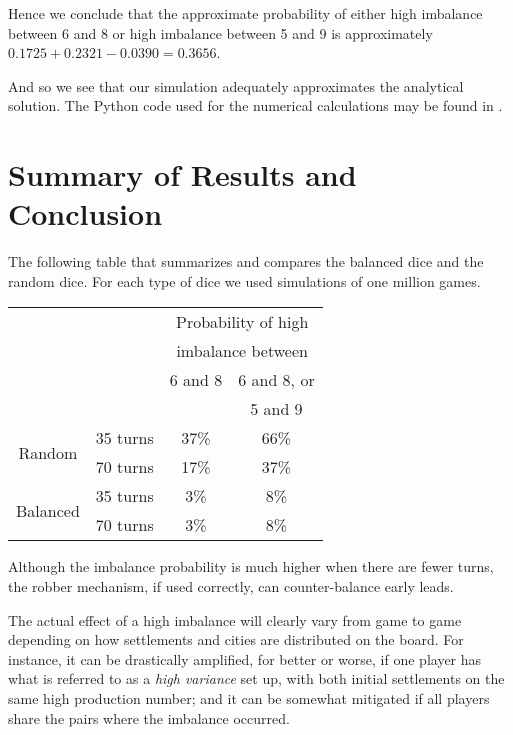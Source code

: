 \documentclass[11pt]{article}
\begin{document}
Hence we conclude that the approximate probability of either high imbalance between 6 and 8 or high imbalance between 5 and 9 is approximately $0.1725 + 0.2321 - 0.0390 = 0.3656$.

And so we see that our simulation adequately approximates the analytical solution. The Python code used for the numerical calculations may be found in \cite{githubsim}.

\section{Summary of Results and Conclusion}
The following table that summarizes and compares the balanced dice and the random dice. For each type of dice we used simulations of one million games.

\begin{center}
\vspace{1cm}

	\begin{tabular}{cc|c|c|}
\cline{3-4}
&& \multicolumn{2}{|c|}{Probability of high} \\
&& \multicolumn{2}{|c|}{imbalance between} \\
\cline{3-4}
&& 6 and 8 & 6 and 8, or \\
&& & 5 and 9 \\
\hline
\multicolumn{1}{|c}{\multirow{2}{*}{Random}} & 
\multicolumn{1}{|c|}{35 turns} & 37\% & 66\% \\
\cline{2-4}
\multicolumn{1}{|c}{\multirow{2}{*}{}} 
& \multicolumn{1}{|c|}{70 turns} & 17\% & 37\% \\
\hline
\multicolumn{1}{|c}{\multirow{2}{*}{Balanced}} & 
\multicolumn{1}{|c|}{35 turns} & 3\% & 8\% \\
\cline{2-4} 
\multicolumn{1}{|c}{\multirow{2}{*}{}} 
& \multicolumn{1}{|c|}{70 turns} & 3\% & 8\% \\
\hline
\end{tabular}
\end{center}
Although the imbalance probability is much higher when there are fewer turns, the robber mechanism, if used correctly, can counter-balance early leads. 

The actual effect of a high imbalance will clearly vary from game to game depending on how settlements and cities are distributed on the board. For instance, it can be drastically amplified, for better or worse, if one player has what is referred to as a \emph{high variance} set up, with both initial settlements on the same high production number; and it can be somewhat mitigated if all players share the pairs where the imbalance occurred. 
\end{document}
